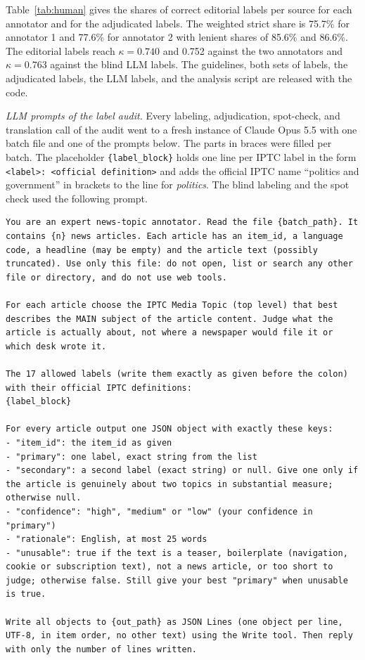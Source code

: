 \documentclass[journal,onecolumn]{IEEEtran}
\begin{document}
Table~\ref{tab:human} gives the shares of correct editorial labels per source for each annotator and for the adjudicated labels. The weighted strict share is 75.7\% for annotator 1 and 77.6\% for annotator 2 with lenient shares of 85.6\% and 86.6\%. The editorial labels reach $\kappa=0.740$ and 0.752 against the two annotators and $\kappa=0.763$ against the blind LLM labels. The guidelines, both sets of labels, the adjudicated labels, the LLM labels, and the analysis script are released with the code.

\textit{LLM prompts of the label audit.} Every labeling, adjudication, spot-check, and translation call of the audit went to a fresh instance of Claude Opus 5.5 with one batch file and one of the prompts below. The parts in braces were filled per batch. The placeholder \texttt{\{label\_block\}} holds one line per IPTC label in the form \texttt{<label>: <official definition>} and adds the official IPTC name ``politics and government'' in brackets to the line for \emph{politics}. The blind labeling and the spot check used the following prompt.
\begin{lstlisting}
You are an expert news-topic annotator. Read the file {batch_path}. It contains {n} news articles. Each article has an item_id, a language code, a headline (may be empty) and the article text (possibly truncated). Use only this file: do not open, list or search any other file or directory, and do not use web tools.

For each article choose the IPTC Media Topic (top level) that best describes the MAIN subject of the article content. Judge what the article is actually about, not where a newspaper would file it or which desk wrote it.

The 17 allowed labels (write them exactly as given before the colon) with their official IPTC definitions:
{label_block}

For every article output one JSON object with exactly these keys:
- "item_id": the item_id as given
- "primary": one label, exact string from the list
- "secondary": a second label (exact string) or null. Give one only if the article is genuinely about two topics in substantial measure; otherwise null.
- "confidence": "high", "medium" or "low" (your confidence in "primary")
- "rationale": English, at most 25 words
- "unusable": true if the text is a teaser, boilerplate (navigation, cookie or subscription text), not a news article, or too short to judge; otherwise false. Still give your best "primary" when unusable is true.

Write all objects to {out_path} as JSON Lines (one object per line, UTF-8, in item order, no other text) using the Write tool. Then reply with only the number of lines written.
\end{lstlisting}
\end{document}
